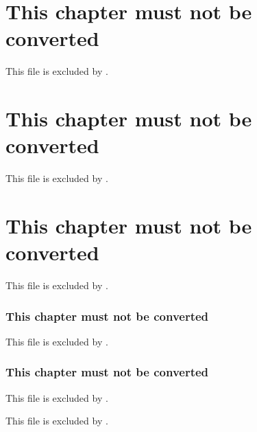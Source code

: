 \section{This chapter must not be converted}

This file is excluded by \mdincludeonly.

\section{This chapter must not be converted}

This file is excluded by \mdincludeonly.

\section{This chapter must not be converted}

This file is excluded by \mdincludeonly.

\begin{frame}[t]
\frametitle{This chapter must not be converted}

\end{frame}

\begin{frame}[t]

This file is excluded by \mdincludeonly.

\end{frame}

\begin{frame}[t]
\frametitle{This chapter must not be converted}

This file is excluded by \mdincludeonly.

\end{frame}

\begin{frame}[t]

This file is excluded by \mdincludeonly.

\end{frame}

